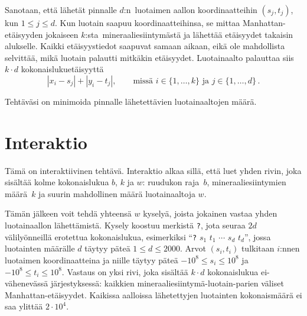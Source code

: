 Sanotaan, että lähetät pinnalle $d$:n~luotaimen aallon koordinaatteihin $(s_j, t_j)$, kun $1\leq j\leq d$.
Kun luotain saapuu koordinaatteihinsa, se mittaa Manhattan-etäisyyden jokaiseen $k$:sta~mineraaliesiintymästä ja lähettää etäisyydet takaisin alukselle.
Kaikki etäisyystiedot saapuvat samaan aikaan, eikä ole mahdollista selvittää, mikä luotain palautti mitkäkin etäisyydet.
Luotainaalto palauttaa siis $k \cdot d$ kokonaislukuetäisyyttä
\[|x_i-s_j| + |y_i - t_j|, \qquad\text{missä } i \in \{1,\ldots,k\} \text{ ja } j \in\{ 1,\ldots,d\}\,.\]

Tehtäväsi on minimoida pinnalle lähetettävien luotainaaltojen määrä.

\section*{Interaktio}

Tämä on interaktiivinen tehtävä.
Interaktio alkaa sillä, että luet yhden rivin, joka sisältää kolme kokonaislukua $b$, $k$ ja $w$:
ruudukon raja~$b$,
mineraaliesiintymien määrä~$k$
ja suurin mahdollinen määrä luotainaaltoja $w$.

Tämän jälkeen voit tehdä yhteensä $w$ kyselyä, joista jokainen vastaa yhden luotainaallon lähettämistä.
Kysely koostuu merkistä \texttt{?}, jota seuraa $2d$ välilyönneillä erotettua kokonaislukua,
esimerkiksi ``\texttt{?} $s_1$ $t_1$ $\cdots$ $s_d$ $t_d$'',
jossa luotainten määrälle $d$ täytyy päteä
$1\leq d\leq 2000$. %
Arvot $(s_i,t_i)$ tulkitaan $i$:nnen luotaimen koordinaatteina ja niille täytyy päteä
$-10^8 \leq s_i \leq 10^8$ ja $-10^8 \leq t_i \leq 10^8$. %
Vastaus on yksi rivi, joka sisältää $k \cdot d$ kokonaislukua
ei-vähenevässä järjestyksessä: %
kaikkien mineraaliesiintymä-luotain-parien väliset Manhattan-etäisyydet.
Kaikissa aalloissa lähetettyjen luotainten kokonaismäärä ei saa ylittää
$2\cdot 10^4.$ %

